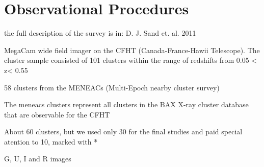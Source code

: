 
\chapter{Observational Procedures}

the full description of the survey is in: D. J. Sand et. al. 2011

MegaCam wide field imager on the CFHT (Canada-France-Hawii Telescope). The cluster sample consisted of 101 clusters within the range of redshifts from 0.05 < z< 0.55

58 clusters from the MENEACs (Multi-Epoch nearby cluster survey)

The meneacs clusters represent all clusters in the BAX X-ray cluster database that are observable for the CFHT

About 60 clusters, but we used only 30 for the final studies and paid special atention to 10, marked with *

G, U, I and R images


